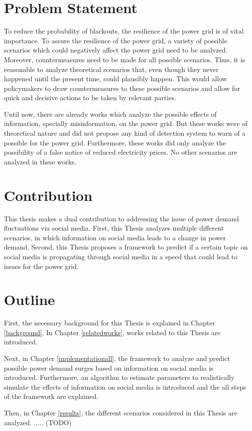 \section{Problem Statement}
\label{problemstatement}

To reduce the probability of blackouts, 
the resilience of the power grid is of vital importance.
To assure the resilience of the power grid, a variety of possible 
scenarios which could negatively affect the power grid need
to be analyzed. Moreover, countermeasures need to be made for all possible scenarios.
Thus, it is reasonable to analyze theoretical scenarios that, even though
they never happened until the present time, could plausibly happen. This 
would allow policymakers to draw countermeasures to these possible scenarios
and allow for quick and decisive actions to be taken by relevant 
parties.

Until now, there are already works which analyze the possible effects
of information, specially misinformation, on the power
grid. But these works were of theoretical nature and did not 
propose any kind of detection system to warn of a possible 
for the power grid. Furthermore, these works did only analyze the 
possibility of a false notice of reduced electricity prices.
No other scenarios are analyzed in these works. 


\section{Contribution}
\label{contribution}
This thesis makes a dual contribution to addressing the issue of 
power demand fluctuations via social media.
First, this Thesis analyzes multiple different scenarios, in which
information on social media leads to a change in power demand.
Second, this Thesis proposes a framework to predict if 
a certain topic on social media is propagating through social media
in a speed that could lead to issues for the power grid.

\section{Outline}
\label{outline}

First, the necessary background for this Thesis is explained
in Chapter \ref{background}. 
In Chapter \ref{relatedworks}, works related to 
this Thesis are introduced.

Next, in Chapter \ref{implementationall}, the framework to
analyze and predict possible power demand surges based on
information on social media is introduced. Furthermore,
an algorithm to estimate parameters to realistically simulate
the effects of information on social media is introduced and 
the all steps of the framework are explained.

Then, in Chapter \ref{results}, the different scenarios considered in this
Thesis are analyzed. ..... (TODO)